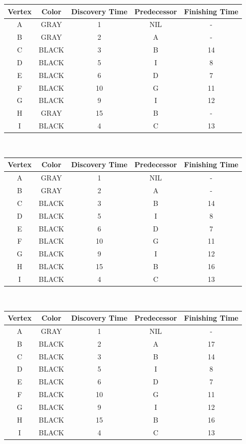 \documentclass[12pt]{article}
\theoremstyle{plain}
\newcommand{\vs}{\vspace{2mm}}
\begin{document}
\begin{tabular}{|c|c|c|c|c|}
    \hline
    Vertex & Color & Discovery Time & Predecessor & Finishing Time \\ \hline
    A & GRAY & 1 & NIL & - \\ \hline
    B & GRAY & 2 & A & - \\ \hline
    C & BLACK & 3 & B & 14 \\ \hline
    D & BLACK & 5 & I & 8 \\ \hline
    E & BLACK & 6 & D & 7 \\ \hline
    F & BLACK & 10 & G & 11 \\ \hline
    G & BLACK & 9 & I & 12 \\ \hline
    H & GRAY & 15 & B & - \\ \hline
    I & BLACK & 4 & C & 13 \\ \hline
\end{tabular}
\vs\

\begin{tabular}{|c|c|c|c|c|}
    \hline
    Vertex & Color & Discovery Time & Predecessor & Finishing Time \\ \hline
    A & GRAY & 1 & NIL & - \\ \hline
    B & GRAY & 2 & A & - \\ \hline
    C & BLACK & 3 & B & 14 \\ \hline
    D & BLACK & 5 & I & 8 \\ \hline
    E & BLACK & 6 & D & 7 \\ \hline
    F & BLACK & 10 & G & 11 \\ \hline
    G & BLACK & 9 & I & 12 \\ \hline
    H & BLACK & 15 & B & 16 \\ \hline
    I & BLACK & 4 & C & 13 \\ \hline
\end{tabular}
\vs\

\begin{tabular}{|c|c|c|c|c|}
    \hline
    Vertex & Color & Discovery Time & Predecessor & Finishing Time \\ \hline
    A & GRAY & 1 & NIL & - \\ \hline
    B & BLACK & 2 & A & 17 \\ \hline
    C & BLACK & 3 & B & 14 \\ \hline
    D & BLACK & 5 & I & 8 \\ \hline
    E & BLACK & 6 & D & 7 \\ \hline
    F & BLACK & 10 & G & 11 \\ \hline
    G & BLACK & 9 & I & 12 \\ \hline
    H & BLACK & 15 & B & 16 \\ \hline
    I & BLACK & 4 & C & 13 \\ \hline
\end{tabular}
\vs\
\end{document}

